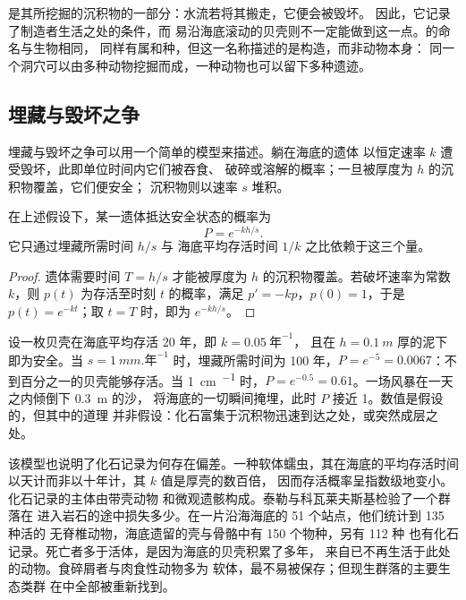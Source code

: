 是其所挖掘的沉积物的一部分：水流若将其搬走，它便会被毁坏。
因此，它记录了制造者生活之处的条件，而
易沿海底滚动的贝壳则不一定能做到这一点。的命名与生物相同，
同样有属和种，但这一名称描述的是构造，而非动物本身：
同一个洞穴可以由多种动物挖掘而成，一种动物也可以留下多种遗迹。

\subsection*{埋藏与毁坏之争}

埋藏与毁坏之争可以用一个简单的模型来描述。躺在海底的遗体
以恒定速率 $k$ 遭受毁坏，此即单位时间内它们被吞食、
破碎或溶解的概率；一旦被厚度为 $h$ 的沉积物覆盖，它们便安全；
沉积物则以速率 $s$ 堆积。

\begin{proposition}[埋藏先于毁坏]\label{prop:b2:palaeoenvironments:burial}
在上述假设下，某一遗体抵达安全状态的概率为
\[
  P = e^{-kh/s}.
\]
它只通过埋藏所需时间 $h/s$ 与
海底平均存活时间 $1/k$ 之比依赖于这三个量。
\end{proposition}

\begin{proof}
遗体需要时间 $T = h/s$ 才能被厚度为 $h$ 的沉积物覆盖。若破坏速率为常数
$k$，则 $p(t)$ 为存活至时刻 $t$ 的概率，满足 $p' = -kp$，$p(0) =
1$，于是 $p(t) = e^{-kt}$；取 $t = T$ 时，即为 $e^{-kh/s}$。
\end{proof}

\begin{example}[平静海底上的一枚贝壳]\label{ex:b2:palaeoenvironments:shell}
设一枚贝壳在海底平均存活 20 年，即 $k = \qty{0.05}{\text{年}^{-1}}$，
且在 $h = \qty{0.1}{m}$ 厚的泥下即为安全。当 $s = \qty{1}{mm.\text{年}^{-1}}$ 时，埋藏所需时间为 100
年，$P = e^{-5} = 0.0067$：不到百分之一的贝壳能够存活。当
\qty{1}{cm.^{-1}} 时，$P = e^{-0.5} = 0.61$。一场风暴在一天之内倾倒下 \qty{0.3}{m} 的沙，
将海底的一切瞬间掩埋，此时 $P$ 接近 1。数值是假设的，但其中的道理
并非假设：化石富集于沉积物迅速到达之处，或突然成层之处。
\end{example}

该模型也说明了化石记录为何存在偏差。一种软体蠕虫，其在海底的平均存活时间
以天计而非以十年计，其 $k$ 值是厚壳的数百倍，
因而存活概率呈指数级地变小。化石记录的主体由带壳动物
和微观遗骸构成。泰勒与科瓦莱夫斯基检验了一个群落在
进入岩石的途中损失多少。在一片沿海海底的 51 个站点，他们统计到 135 种活的
无脊椎动物，海底遗留的壳与骨骼中有 150 个物种，另有 112 种
也有化石记录。死亡者多于活体，是因为海底的贝壳积累了多年，
来自已不再生活于此处的动物。食碎屑者与肉食性动物多为
软体，最不易被保存；但现生群落的主要生态类群
在中全部被重新找到。

